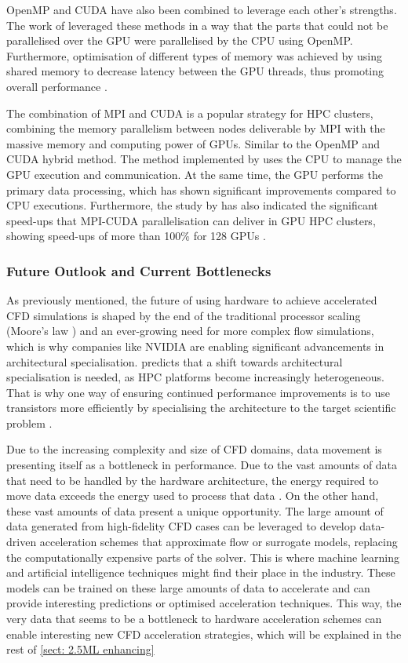 OpenMP and CUDA have also been combined to leverage each other's strengths. The work of \textcite{Yue2014} leveraged these methods in a way that the parts that could not be parallelised over the GPU were parallelised by the CPU using OpenMP. Furthermore, optimisation of different types of memory was achieved by using shared memory to decrease latency between the GPU threads, thus promoting overall performance \cite{Afzal2017}.

The combination of MPI and CUDA is a popular strategy for HPC clusters, combining the memory parallelism between nodes deliverable by MPI with the massive memory and computing power of GPUs. Similar to the OpenMP and CUDA hybrid method. The method implemented by \textcite{Lai2020} uses the CPU to manage the GPU execution and communication. At the same time, the GPU performs the primary data processing,  which has shown significant improvements compared to CPU executions. Furthermore, the study by \textcite{Jacobsen2010} has also indicated the significant speed-ups that MPI-CUDA parallelisation can deliver in GPU HPC clusters, showing speed-ups of more than 100\% for 128 GPUs \cite{Jacobsen2010}.

\subsubsection{Future Outlook and Current Bottlenecks}
As previously mentioned, the future of using hardware to achieve accelerated CFD simulations is shaped by the end of the traditional processor scaling (Moore's law \cite{moore1965}) and an ever-growing need for more complex flow simulations, which is why companies like NVIDIA are enabling significant advancements in architectural specialisation. \textcite{Shalf2020} predicts that a shift towards architectural specialisation is needed, as HPC platforms become increasingly heterogeneous. That is why one way of ensuring continued performance improvements is to use transistors more efficiently by specialising the architecture to the target scientific problem \cite{Shalf2020}.

Due to the increasing complexity and size of CFD domains, data movement is presenting itself as a bottleneck in performance. Due to the vast amounts of data that need to be handled by the hardware architecture, the energy required to move data exceeds the energy used to process that data \cite{Shalf2020}. On the other hand, these vast amounts of data present a unique opportunity. The large amount of data generated from high-fidelity CFD cases can be leveraged to develop data-driven acceleration schemes that approximate flow or surrogate models, replacing the computationally expensive parts of the solver. This is where machine learning and artificial intelligence techniques might find their place in the industry. These models can be trained on these large amounts of data to accelerate and can provide interesting predictions or optimised acceleration techniques. This way, the very data that seems to be a bottleneck to hardware acceleration schemes can enable interesting new CFD acceleration strategies, which will be explained in the rest of \autoref{sect: 2.5ML enhancing}

